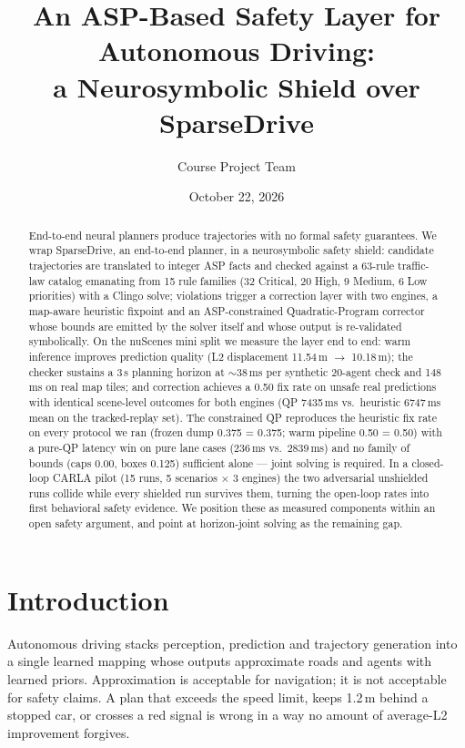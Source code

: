 \documentclass[11pt]{article}
\title{An ASP-Based Safety Layer for Autonomous Driving:\\
a Neurosymbolic Shield over SparseDrive}
\author{Course Project Team}
\date{October 22, 2026}
\begin{document}
\maketitle

\begin{abstract}
End-to-end neural planners produce trajectories with no formal safety
guarantees. We wrap SparseDrive, an end-to-end planner, in a
neurosymbolic safety shield: candidate trajectories are translated to
integer ASP facts and checked against a 63-rule traffic-law catalog
emanating from 15 rule families (32 Critical, 20 High, 9 Medium, 6 Low
priorities) with a Clingo solve; violations trigger a correction layer
with two engines, a map-aware heuristic fixpoint and an
ASP-constrained Quadratic-Program corrector whose bounds are emitted
by the solver itself and whose output is re-validated symbolically.
On the nuScenes mini split we measure the layer end to end: warm
inference improves prediction quality (L2 displacement 11.54\,m
$\to$ 10.18\,m); the checker sustains a 3\,s planning horizon at
$\sim$38\,ms per synthetic 20-agent check and 148\,ms on real map
tiles; and correction achieves a 0.50 fix rate on unsafe real
predictions with identical scene-level outcomes for both engines
(QP 7435\,ms vs.\ heuristic 6747\,ms mean on the tracked-replay set).
The constrained QP reproduces the heuristic fix rate on every
protocol we ran (frozen dump 0.375 = 0.375; warm pipeline 0.50 =
0.50) with a pure-QP latency win on pure lane cases (236\,ms vs.\
2839\,ms) and no family of bounds (caps 0.00, boxes 0.125) sufficient
alone --- joint solving is required. In a closed-loop CARLA pilot
(15 runs, 5 scenarios $\times$ 3 engines) the two adversarial
unshielded runs collide while every shielded run survives them,
turning the open-loop rates into first behavioral safety evidence.
We position these as measured components within an open safety
argument, and point at horizon-joint solving as the remaining gap.
\end{abstract}

\section{Introduction}
\label{sec:intro}

Autonomous driving stacks perception, prediction and trajectory
generation into a single learned mapping whose outputs approximate
roads and agents with learned priors. Approximation is acceptable for
navigation; it is not acceptable for safety claims. A plan that
exceeds the speed limit, keeps 1.2\,m behind a stopped car, or
crosses a red signal is wrong in a way no amount of average-L2
improvement forgives.
\end{document}
